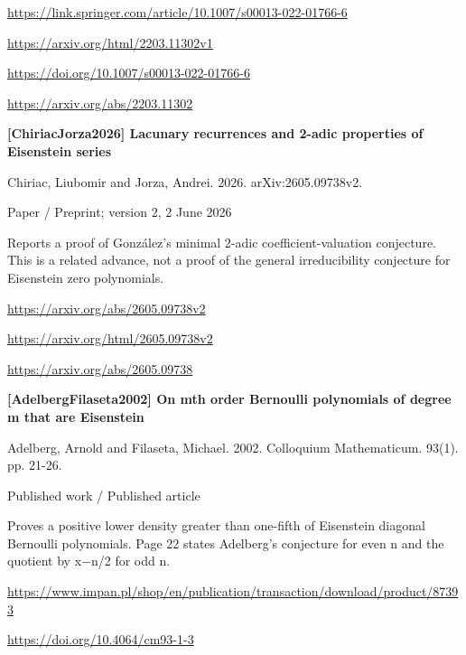 \documentclass[11pt,a4paper,oneside,openany]{book}
\begin{document}
{\footnotesize\url{https://link.springer.com/article/10.1007/s00013-022-01766-6}}\par
{\footnotesize\url{https://arxiv.org/html/2203.11302v1}}\par
{\footnotesize\url{https://doi.org/10.1007/s00013-022-01766-6}}\par
{\footnotesize\url{https://arxiv.org/abs/2203.11302}}\par
\vspace{9pt}
\hypertarget{ref:ChiriacJorza2026}{}
{\sffamily\bfseries\color{atlasgreen}[ChiriacJorza2026] Lacunary recurrences and 2-adic properties of Eisenstein series}\par
\color{black} Chiriac, Liubomir and Jorza, Andrei. 2026. arXiv:2605.09738v2.\par
{\small\sffamily\color{atlasgold}Paper / Preprint; version 2, 2 June 2026}\par
\color{black} Reports a proof of González's minimal 2-adic coefficient-valuation conjecture. This is a related advance, not a proof of the general irreducibility conjecture for Eisenstein zero polynomials.\par
{\footnotesize\url{https://arxiv.org/abs/2605.09738v2}}\par
{\footnotesize\url{https://arxiv.org/html/2605.09738v2}}\par
{\footnotesize\url{https://arxiv.org/abs/2605.09738}}\par
\vspace{9pt}
\hypertarget{ref:AdelbergFilaseta2002}{}
{\sffamily\bfseries\color{atlasgreen}[AdelbergFilaseta2002] On mth order Bernoulli polynomials of degree m that are Eisenstein}\par
\color{black} Adelberg, Arnold and Filaseta, Michael. 2002. Colloquium Mathematicum. 93(1). pp. 21-26.\par
{\small\sffamily\color{atlasgold}Published work / Published article}\par
\color{black} Proves a positive lower density greater than one-fifth of Eisenstein diagonal Bernoulli polynomials. Page 22 states Adelberg's conjecture for even n and the quotient by x\ensuremath{-}n/2 for odd n.\par
{\footnotesize\url{https://www.impan.pl/shop/en/publication/transaction/download/product/87393}}\par
{\footnotesize\url{https://doi.org/10.4064/cm93-1-3}}\par
\vspace{9pt}
\end{document}
